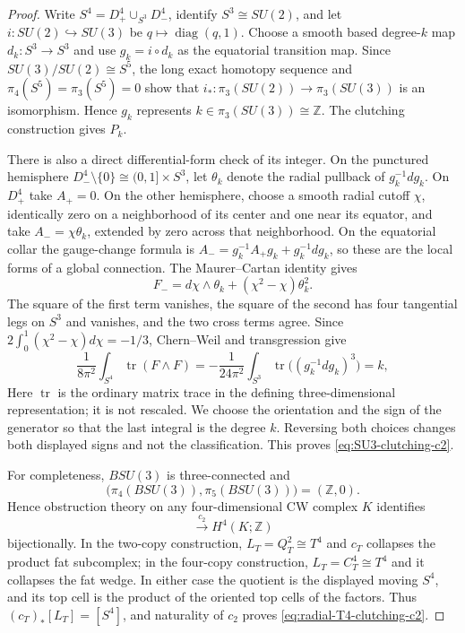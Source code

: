 \documentclass[11pt,letterpaper]{article}
\numberwithin{equation}{section}
\theoremstyle{definition}
\theoremstyle{remark}
\newcommand{\Z}{\mathbb Z}
\begin{document}
\begin{proof}
Write \(S^4=D^4_+\cup_{S^3}D^4_-\), identify
\(S^3\cong SU(2)\), and let
\(i:SU(2)\hookrightarrow SU(3)\) be
\(q\mapsto\operatorname{diag}(q,1)\).
Choose a smooth based degree-\(k\) map \(d_k:S^3\to S^3\) and use
\(g_k=i\circ d_k\) as the equatorial transition map.  Since
\(SU(3)/SU(2)\cong S^5\), the long exact homotopy sequence and
\(\pi_4(S^5)=\pi_3(S^5)=0\) show that
\(i_*:\pi_3(SU(2))\to\pi_3(SU(3))\) is an isomorphism.  Hence \(g_k\) represents
\(k\in\pi_3(SU(3))\cong\Z\).  The clutching construction gives \(P_k\).

There is also a direct differential-form check of its integer.  On the
punctured hemisphere \(D^4_-\setminus\{0\}\cong(0,1]\times S^3\), let
\(\theta_k\) denote the radial pullback of \(g_k^{-1}dg_k\).  On
\(D^4_+\) take \(A_+=0\).  On the other hemisphere, choose a smooth
radial cutoff \(\chi\), identically zero on a neighborhood of its center
and one near its equator, and take \(A_-=\chi\theta_k\), extended by zero
across that neighborhood.  On the equatorial collar
the gauge-change formula is
\(A_-=g_k^{-1}A_+g_k+g_k^{-1}dg_k\), so these are the local forms of a
global connection.  The Maurer--Cartan identity gives
\begin{equation}
 F_-=d\chi\wedge\theta_k+(\chi^2-\chi)\theta_k^2.
 \label{eq:clutching-curvature}
\end{equation}
The square of the first term vanishes, the square of the second has four
tangential legs on \(S^3\) and vanishes, and the two cross terms agree.
Since
\(2\int_0^1(\chi^2-\chi)d\chi=-1/3\), Chern--Weil and transgression give
\begin{equation}
 \frac1{8\pi^2}\int_{S^4}\operatorname{tr}(F\wedge F)
 =-\frac1{24\pi^2}\int_{S^3}
       \operatorname{tr}\bigl((g_k^{-1}dg_k)^3\bigr)=k,
 \label{eq:clutching-Chern-Weil}
\end{equation}
Here \(\operatorname{tr}\) is the ordinary matrix trace in the defining
three-dimensional representation; it is not rescaled.  We choose the
orientation and the sign of the generator so that the last integral is
the degree \(k\).  Reversing both choices changes both displayed signs and
not the classification.  This proves \cref{eq:SU3-clutching-c2}.

For completeness, \(BSU(3)\) is three-connected and
\[
 \bigl(\pi_4(BSU(3)),\pi_5(BSU(3))\bigr)=(\Z,0).
\]
Hence obstruction theory on any four-dimensional CW complex \(K\)
identifies
\begin{equation}
 [K,BSU(3)]\xrightarrow{\ c_2\ }H^4(K;\Z)
 \label{eq:SU3-bundles-on-four-complex}
\end{equation}
bijectionally.  In the two-copy construction, \(L_T=Q_T^2\cong T^4\)
and \(c_T\) collapses the product fat subcomplex; in the four-copy
construction, \(L_T=C_T^4\cong T^4\) and it collapses the fat wedge.
In either case the quotient is the displayed moving \(S^4\), and its top
cell is the product of the oriented top cells of the factors.  Thus
\((c_T)_*[L_T]=[S^4]\), and naturality of \(c_2\) proves
\cref{eq:radial-T4-clutching-c2}.


\end{proof}
\end{document}
